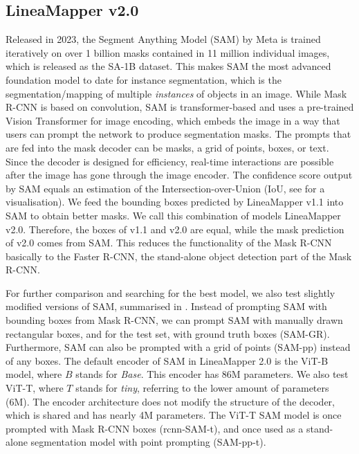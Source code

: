 \subsection{LineaMapper v2.0}\label{sec:LMv2.0}
Released in 2023, the Segment Anything Model (SAM) by Meta is trained iteratively on over 1 billion masks contained in 11 million individual images, which is released as the SA-1B dataset. This makes SAM the most advanced foundation model to date for instance segmentation, which is the segmentation/mapping of multiple \textit{instances} of objects in an image. While Mask R-CNN is based on convolution, SAM is transformer-based and uses a pre-trained Vision Transformer for image encoding, which embeds the image in a way that users can prompt the network to produce segmentation masks. The prompts that are fed into the mask decoder can be masks, a grid of points, boxes, or text. Since the decoder is designed for efficiency, real-time interactions are possible after the image has gone through the image encoder. 
The confidence score output by SAM equals an estimation of the Intersection-over-Union (IoU, see for a visualisation).
We feed the bounding boxes predicted by LineaMapper v1.1 into SAM to obtain better masks. We call this combination of models LineaMapper v2.0. Therefore, the boxes of v1.1 and v2.0 are equal, while the mask prediction of v2.0 comes from SAM. This reduces the functionality of the Mask R-CNN basically to the Faster R-CNN, the stand-alone object detection part of the Mask R-CNN. 

For further comparison and searching for the best model, we also test slightly modified versions of SAM, summarised in . Instead of prompting SAM with bounding boxes from Mask R-CNN, we can prompt SAM with manually drawn rectangular boxes, and for the test set, with ground truth boxes (SAM-GR). Furthermore, SAM can also be prompted with a grid of points (SAM-pp) instead of any boxes. The default encoder of SAM in LineaMapper 2.0 is the ViT-B model, where $B$ stands for \textit{Base}. This encoder has 86M parameters. We also test ViT-T, where $T$ stands for \textit{tiny}, referring to the lower amount of parameters (6M). The encoder architecture does not modify the structure of the decoder, which is shared and has nearly 4M parameters. The ViT-T SAM model is once prompted with Mask R-CNN boxes (rcnn-SAM-t), and once used as a stand-alone segmentation model with point prompting (SAM-pp-t).

